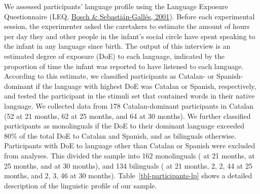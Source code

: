 \documentclass[
  letterpaper,
  DIV=11,
  numbers=noendperiod]{scrartcl}
\begin{document}
We assessed participants' language profile using the Language Exposure
Questionnaire (LEQ, \protect\hyperlink{ref-bosch2001evidence}{Bosch \&
Sebastián-Gallés, 2001}). Before each experimental session, the
experimenter asked the caretakers to estimate the amount of hours per
day they and other people in the infant's social circle have spent
speaking to the infant in any language since birth. The output of this
interview is an estimated degree of exposure (DoE) to each language,
indicated by the proportion of time the infant was reported to have
listened to each language. According to this estimate, we classified
participants as Catalan- or Spanish-dominant if the language with
highest DoE was Catalan or Spanish, respectively, and tested the
participant in the stimuli set that contained words in their native
language. We collected data from 178 Catalan-dominant participants in
Catalan (52 at 21 months, 62 at 25 months, and 64 at 30 months). We
further classified participants as monolinguals if the DoE to their
dominant language exceeded 80\% of the total DoE to Catalan and Spanish,
and as bilinguals otherwise. Participants with DoE to language other
than Catalan or Spanish were excluded from analyses. This divided the
sample into 162 monolinguals ( at 21 months, at 25 months, and at 30
months), and 134 bilinguals ( at 21 months, 2, 2, 44 at 25 months, and
2, 3, 46 at 30 months). Table~\ref{tbl-participants-lp} shows a detailed
description of the linguistic profile of our sample.
\end{document}
